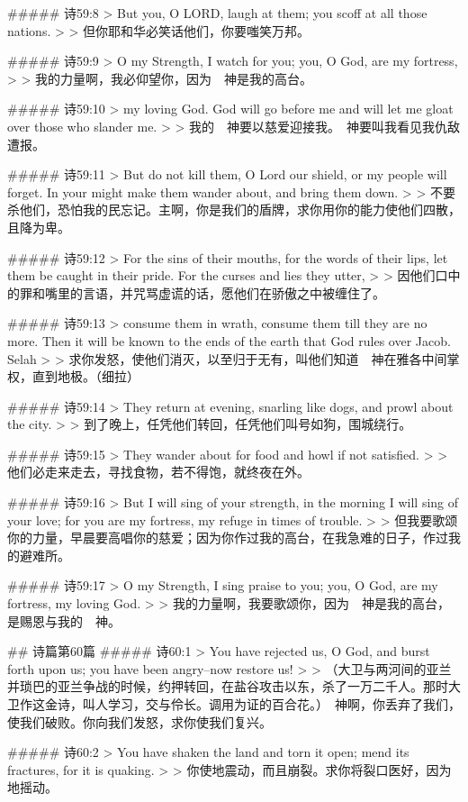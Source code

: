 ##### 诗59:8
> But you, O LORD, laugh at them; you scoff at all those nations.
>
> 但你耶和华必笑话他们，你要嗤笑万邦。


##### 诗59:9
> O my Strength, I watch for you; you, O God, are my fortress,
>
> 我的力量啊，我必仰望你，因为　神是我的高台。


##### 诗59:10
> my loving God. God will go before me and will let me gloat over those who slander me.
>
> 我的　神要以慈爱迎接我。　神要叫我看见我仇敌遭报。


##### 诗59:11
> But do not kill them, O Lord our shield, or my people will forget. In your might make them wander about, and bring them down.
>
> 不要杀他们，恐怕我的民忘记。主啊，你是我们的盾牌，求你用你的能力使他们四散，且降为卑。


##### 诗59:12
> For the sins of their mouths, for the words of their lips, let them be caught in their pride. For the curses and lies they utter,
>
> 因他们口中的罪和嘴里的言语，并咒骂虚谎的话，愿他们在骄傲之中被缠住了。


##### 诗59:13
> consume them in wrath, consume them till they are no more. Then it will be known to the ends of the earth that God rules over Jacob. Selah
>
> 求你发怒，使他们消灭，以至归于无有，叫他们知道　神在雅各中间掌权，直到地极。（细拉）


##### 诗59:14
> They return at evening, snarling like dogs, and prowl about the city.
>
> 到了晚上，任凭他们转回，任凭他们叫号如狗，围城绕行。


##### 诗59:15
> They wander about for food and howl if not satisfied.
>
> 他们必走来走去，寻找食物，若不得饱，就终夜在外。


##### 诗59:16
> But I will sing of your strength, in the morning I will sing of your love; for you are my fortress, my refuge in times of trouble.
>
> 但我要歌颂你的力量，早晨要高唱你的慈爱；因为你作过我的高台，在我急难的日子，作过我的避难所。


##### 诗59:17
> O my Strength, I sing praise to you; you, O God, are my fortress, my loving God.
>
> 我的力量啊，我要歌颂你，因为　神是我的高台，是赐恩与我的　神。


## 诗篇第60篇
##### 诗60:1
> You have rejected us, O God, and burst forth upon us; you have been angry--now restore us!
>
> （大卫与两河间的亚兰并琐巴的亚兰争战的时候，约押转回，在盐谷攻击以东，杀了一万二千人。那时大卫作这金诗，叫人学习，交与伶长。调用为证的百合花。）　神啊，你丢弃了我们，使我们破败。你向我们发怒，求你使我们复兴。


##### 诗60:2
> You have shaken the land and torn it open; mend its fractures, for it is quaking.
>
> 你使地震动，而且崩裂。求你将裂口医好，因为地摇动。


